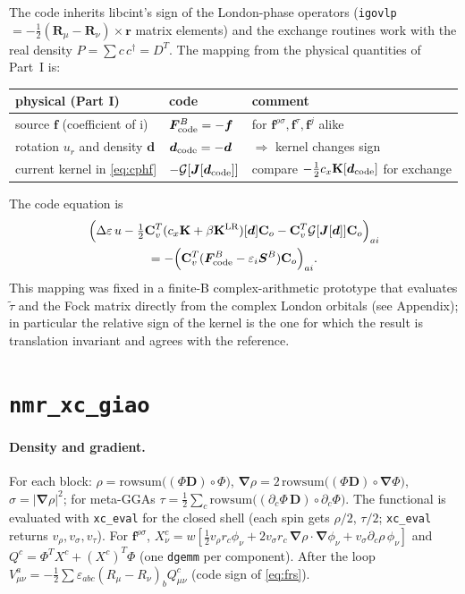 \documentclass[11pt,a4paper]{article}
\newcommand{\rr}{\bm{r}}
\newcommand{\grad}{\bm{\nabla}}
\newcommand{\ttil}{\tilde\tau}
\newcommand{\Dm}{\mathbf{D}}
\newcommand{\ci}{\mathrm{i}}
\begin{document}
The code inherits libcint's sign of the London-phase operators (\texttt{igovlp} $=-\tfrac12(\bm R_\mu-\bm R_\nu)\times\rr$ matrix elements) and the exchange routines work with the real density $P=\sum c\,c^\dagger=D^T$. The mapping from the physical quantities of Part~I is:
\begin{center}
\begin{tabular}{lll}
\toprule
physical (Part I) & code & comment\\
\midrule
source $\bm f$ (coefficient of $\ci$) & $\bm F^B_{\rm code}=-\bm f$ & for $\bm f^{\rho\sigma},\bm f^\tau,\bm f^j$ alike\\
rotation $u_r$ and density $\bm d$ & $\bm d_{\rm code}=-\bm d$ & $\Rightarrow$ kernel changes sign\\
current kernel in \eqref{eq:cphf} & $-\mathcal G[\bm J[\bm d_{\rm code}]]$ & compare $-\tfrac12c_x\mathbf K[\bm d_{\rm code}]$ for exchange\\
\bottomrule
\end{tabular}
\end{center}
The code equation is
\begin{multline}
\Big(\Delta\varepsilon\,u-\tfrac12\mathbf C_v^T(c_x\mathbf K+\beta\mathbf K^{\rm LR})[\bm d]\mathbf C_o-\mathbf C_v^T\mathcal G[\bm J[\bm d]]\mathbf C_o\Big)_{ai}\\
=-\Big(\mathbf C_v^T(\bm F^B_{\rm code}-\varepsilon_i\bm S^B)\mathbf C_o\Big)_{ai}.
\end{multline}
This mapping was fixed in a finite-B complex-arithmetic prototype that evaluates $\ttil$ and the Fock matrix directly from the complex London orbitals (see Appendix); in particular the relative sign of the kernel is the one for which the result is translation invariant and agrees with the reference.

\section{\texttt{nmr\_xc\_giao}}

\paragraph{Density and gradient.} For each block: $\rho=\mathrm{rowsum}\big((\Phi\Dm)\circ\Phi\big)$, $\grad\rho=2\,\mathrm{rowsum}\big((\Phi\Dm)\circ\grad\Phi\big)$, $\sigma=|\grad\rho|^2$; for meta-GGAs $\tau=\tfrac12\sum_c\mathrm{rowsum}\big((\partial_c\Phi\,\Dm)\circ\partial_c\Phi\big)$. The functional is evaluated with \texttt{xc\_eval} for the closed shell (each spin gets $\rho/2$, $\tau/2$; \texttt{xc\_eval} returns $v_\rho,v_\sigma,v_\tau$). For $\bm f^{\rho\sigma}$, $X^c_\nu=w[\tfrac12v_\rho r_c\phi_\nu+2v_\sigma r_c\,\grad\rho\!\cdot\!\grad\phi_\nu+v_\sigma\partial_c\rho\,\phi_\nu]$ and $Q^c=\Phi^TX^c+(X^c)^T\Phi$ (one \texttt{dgemm} per component). After the loop
$V^a_{\mu\nu}=-\tfrac12\sum\varepsilon_{abc}(R_\mu-R_\nu)_bQ^c_{\mu\nu}$ (code sign of \eqref{eq:frs}).
\end{document}
